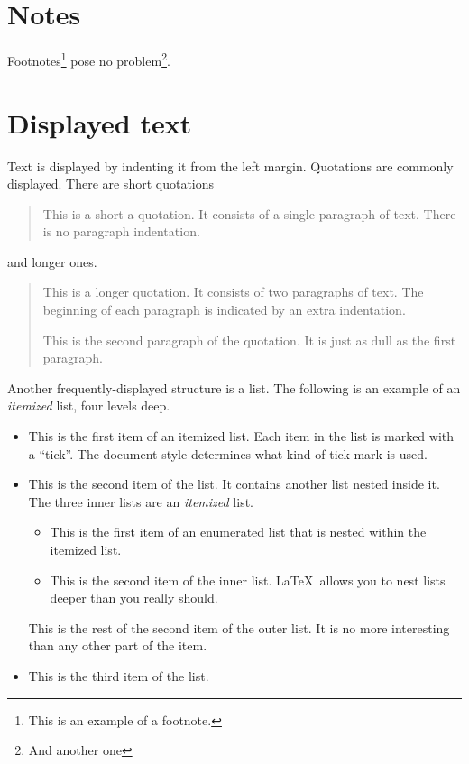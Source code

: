 \documentclass[ejs]{imsart}
\numberwithin{equation}{section}
\theoremstyle{plain}
\theoremstyle{definition}
\theoremstyle{remark}
\begin{document}
\section{Notes}
Footnotes\footnote{This is an example of a footnote.}
pose no problem\footnote{And another one}.

\section{Displayed text}

Text is displayed by indenting it from the left margin.
Quotations are commonly displayed.  There are short quotations
\begin{quote}
   This is a short a quotation.  It consists of a
   single paragraph of text.  There is no paragraph
   indentation.
\end{quote}
and longer ones.
\begin{quotation}
   This is a longer quotation.  It consists of two paragraphs
   of text.  The beginning of each paragraph is indicated
   by an extra indentation.

   This is the second paragraph of the quotation.  It is just
   as dull as the first paragraph.
\end{quotation}
Another frequently-displayed structure is a list.
The following is an example of an {\em itemized} list, four levels deep.
\begin{itemize}
\item  This is the first item of an itemized list.  Each item
      in the list is marked with a ``tick''.  The document
      style determines what kind of tick mark is used.
\item  This is the second item of the list.  It contains another
      list nested inside it.  The three inner lists are an {\em itemized}
      list.
    \begin{itemize}
       \item This is the first item of an enumerated list that
            is nested within the itemized list.
          \item This is the second item of the inner list.  \LaTeX\
            allows you to nest lists deeper than you really should.
      \end{itemize}
      This is the rest of the second item of the outer list.  It
      is no more interesting than any other part of the item.
   \item  This is the third item of the list.
\end{itemize}
\end{document}
